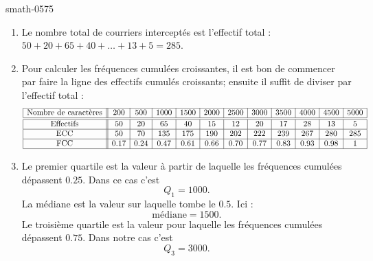 
\begin{corrige}{smath-0575}

    \begin{enumerate}
        \item
            Le nombre total de courriers interceptés est l'effectif total : \( 50+20+65+40+\ldots +13+5=285\).
        \item
            Pour calculer les fréquences cumulées croissantes, il est bon de commencer par faire la ligne des effectifs cumulés croissants; ensuite il suffit de diviser par l'effectif total :
    \begin{equation*}
        \begin{array}[]{|c||c|c|c|c|c|c|c|c|c|c|c|}
            \hline
            \text{Nombre de caractères}&200&500&1000&1500&2000&2500&3000&3500&4000&4500&5000\\
            \hline\hline
            \text{Effectifs}&50&20&65&40&15&12&20&17&28&13&5\\
            \hline
            \text{ECC}&50&70&135&175&190&202&222&239&267&280&285\\
            \hline
            \text{FCC}&0.17&0.24&0.47&0.61&0.66&0.70&0.77&0.83&0.93&0.98&1\\
            \hline
        \end{array}
    \end{equation*}
        \item
            Le premier quartile est la valeur à partir de laquelle les fréquences cumulées dépassent \( 0.25\). Dans ce cas c'est
            \begin{equation}
                Q_1=1000.
            \end{equation}
            La médiane est la valeur sur laquelle tombe le \( 0.5\). Ici : 
            \begin{equation}
                \text{médiane}=1500.
            \end{equation}
            Le troisième quartile est la valeur pour laquelle les fréquences cumulées dépassent \( 0.75\). Dans notre cas c'est
            \begin{equation}
                Q_3=3000.
            \end{equation}

    \end{enumerate}

\end{corrige}
